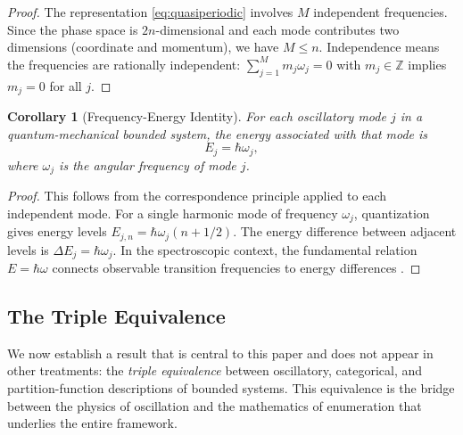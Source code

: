 \documentclass[11pt,twocolumn,a4paper]{article}
\newtheorem{corollary}[theorem]{Corollary}
\theoremstyle{definition}
\theoremstyle{remark}
\newcommand{\Integer}{\mathbb{Z}}
\begin{document}
\begin{proof}
The representation \eqref{eq:quasiperiodic} involves $M$ independent frequencies. Since the phase space is $2n$-dimensional and each mode contributes two dimensions (coordinate and momentum), we have $M \leq n$. Independence means the frequencies are rationally independent: $\sum_{j=1}^M m_j \omega_j = 0$ with $m_j \in \Integer$ implies $m_j = 0$ for all $j$.
\end{proof}

\begin{corollary}[Frequency-Energy Identity]\label{cor:freq-energy}
For each oscillatory mode $j$ in a quantum-mechanical bounded system, the energy associated with that mode is
\begin{equation}\label{eq:freq-energy}
  E_j = \hbar \omega_j,
\end{equation}
where $\omega_j$ is the angular frequency of mode $j$.
\end{corollary}

\begin{proof}
This follows from the correspondence principle applied to each independent mode. For a single harmonic mode of frequency $\omega_j$, quantization gives energy levels $E_{j,n} = \hbar \omega_j (n + 1/2)$. The energy difference between adjacent levels is $\Delta E_j = \hbar \omega_j$. In the spectroscopic context, the fundamental relation $E = \hbar \omega$ connects observable transition frequencies to energy differences \citep{planck1901,einstein1905a,bohr1913}.
\end{proof}

\subsection{The Triple Equivalence}\label{sec:triple-equiv}

We now establish a result that is central to this paper and does not appear in other treatments: the \emph{triple equivalence} between oscillatory, categorical, and partition-function descriptions of bounded systems. This equivalence is the bridge between the physics of oscillation and the mathematics of enumeration that underlies the entire framework.
\end{document}
